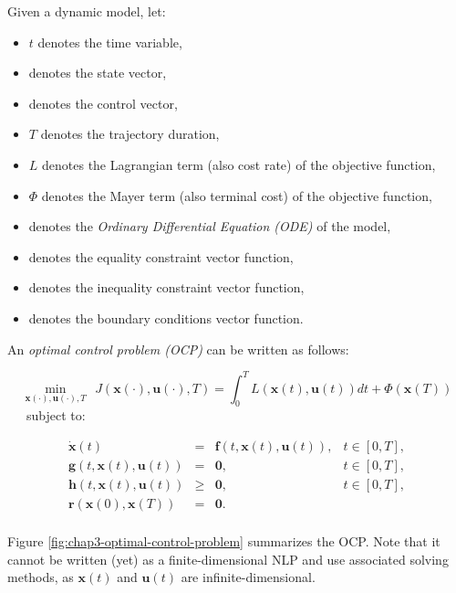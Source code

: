 Given a dynamic model, let:
\begin{itemize}[noitemsep,nolistsep]
\item $t$ denotes the time variable,
\item \state{} denotes the state vector,
\item \control{} denotes the control vector,
\item $T$ denotes the trajectory duration,
\item $L$ denotes the Lagrangian term (also cost rate) of the
  objective function,
\item $\Phi$ denotes the Mayer term (also terminal cost) of the
  objective function,
\item \dfcn{} denotes the \emph{Ordinary Differential Equation (ODE)}
  of the model,
\item \eqcstr{} denotes the equality constraint vector function,
\item \ineqcstr{} denotes the inequality constraint vector function,
\item \bndcstr{} denotes the boundary conditions vector function.
\end{itemize}
\vspace{\baselineskip}

An \emph{optimal control problem (OCP)} can be written as follows:

\label{OCP}
\begin{equation}
  \min_{\mathbf{x} (\cdot), \mathbf{u} (\cdot), T} \ \ 
  J(\mathbf{x}(\cdot),\mathbf{u}(\cdot),T) = \int_{0}^{T}L (\mathbf{x}(t), \mathbf{u}(t))dt + \Phi(\mathbf{x}(T))
  \label{OCP:Obj}
\end{equation}
\noindent \ \ \ subject to:

\begin{equation}
  \begin{array}{rclr}
  \dot{\mathbf{x}} (t) & = & \mathbf{f}(t, \mathbf{x}(t),
  \mathbf{u}(t)), & t\in[0,T],%
  \label{OCP:Model}%
  \\%
  \mathbf{g}(t, \mathbf{x}(t), \mathbf{u}(t)) & = & \mathbf{0}, & t\in[0,T],%
  \\%
  \mathbf{h}(t, \mathbf{x}(t), \mathbf{u}(t)) & \ge & \mathbf{0}, & t\in[0,T],%
  \\%
  \mathbf{r} (\mathbf{x}(0), \mathbf{x}(T)) & = & \mathbf{0}.%
  \\%
  \end{array}
\end{equation}

Figure \ref{fig:chap3-optimal-control-problem} summarizes the
OCP. Note that it cannot be written (yet) as a finite-dimensional NLP
and use associated solving methods, as $\mathbf{x}(t)$ and
$\mathbf{u}(t)$ are infinite-dimensional.

